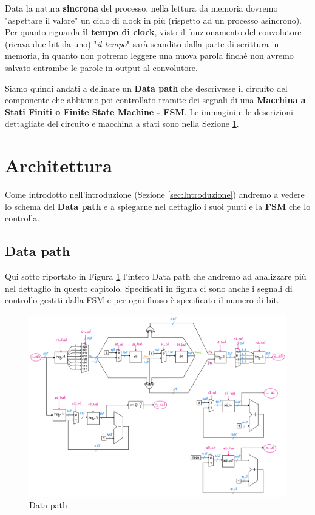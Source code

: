 \documentclass[12pt]{article} %
\begin{document}
			Data la natura \textbf{sincrona} del processo, 
			nella lettura da memoria dovremo "aspettare il valore" 
			un ciclo di clock in più (rispetto ad un processo asincrono). 
			Per quanto riguarda \textbf{il tempo di clock}, visto il funzionamento del convolutore 
			(ricava due bit da uno) "\textit{il tempo}" sarà scandito dalla parte di scrittura in memoria,
			in quanto non potremo leggere una nuova parola finché non avremo salvato entrambe 
			le parole in output al convolutore.
			\newline
			
			Siamo quindi andati a delinare un \textbf{Data path} che descrivesse il circuito
			del componente che abbiamo poi controllato tramite dei segnali di una 
			\textbf{Macchina a Stati Finiti o Finite State Machine - FSM}. 
			Le immagini e le descrizioni dettagliate del circuito e macchina a stati %
			sono nella Sezione \ref{sec:Architettura}.
			
			\newpage
	\section{Architettura}
	\label{sec:Architettura}
		Come introdotto nell'introduzione (Sezione \ref{sec:Introduzione}) andremo a vedere
		lo schema del \textbf{Data path} e a spiegarne nel dettaglio i suoi punti e la \textbf{FSM}
		che lo controlla.
		\subsection{Data path}
		\label{sec:Data_path}
			Qui sotto riportato in Figura \ref{fig:Data_path} l'intero Data path che andremo ad 
			analizzare più nel dettaglio in questo capitolo. 
			Specificati in figura ci sono anche i segnali di controllo gestiti dalla FSM e 
			per ogni flusso è specificato il numero di bit.
			\begin{figure}[h]
				\centering
				\includegraphics[width=\textwidth]{Data_path.jpg}
				\caption{Data path}
				\label{fig:Data_path}
			\end{figure}
			\newpage
\end{document}
